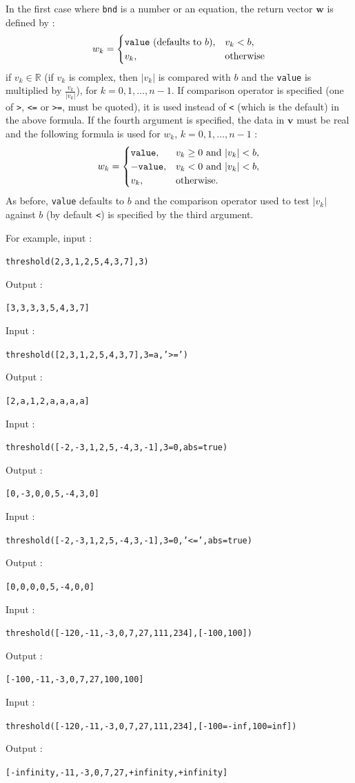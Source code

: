\documentclass[a4paper,11pt]{book}
\begin{document}
In the first case where {\tt bnd} is a number or an equation, the return vector $ \mathbf{w} $ is defined by :
\[ w_k=\begin{cases}
\text{{\tt value} (defaults to $ b $)},&v_k<b,\\
v_k,&\text{otherwise}
\end{cases} \]
if $ v_k\in\mathbb{R} $ (if $ v_k $ is complex, then $ |v_k| $ is compared with $ b $ and the {\tt value} is multiplied by $ \frac{v_k}{|v_k|} $), for $ k=0,1,\dots,n-1 $. If comparison operator is specified (one of {\tt >}, {\tt <=} or {\tt >=}, must be quoted), it is used instead of {\tt <} (which is the default) in the above formula. If the fourth argument is specified, the data in $ \mathbf{v} $ must be real and the following formula is used for $ w_k $, $ k=0,1,\dots,n-1 $ :
\[ w_k=\begin{cases}
\text{{\tt value}},& \text{$ v_k\geq 0 $ and $ |v_k|<b $},\\
-\text{{\tt value}},& \text{$ v_k<0 $ and $ |v_k|<b $},\\
v_k,&\text{otherwise}.
\end{cases} \]
As before, {\tt value} defaults to $ b $ and the comparison operator used to test $ |v_k| $ against $ b $ (by default {\tt <}) is specified by the third argument.

For example, input :
\begin{center}
	{\tt threshold(2,3,1,2,5,4,3,7],3)}
\end{center}
Output :
\begin{center}
	{\tt [3,3,3,3,5,4,3,7]}
\end{center}
Input :
\begin{center}
	{\tt threshold([2,3,1,2,5,4,3,7],3=a,'>=')}
\end{center}
Output :
\begin{center}
	{\tt [2,a,1,2,a,a,a,a]}
\end{center}
Input :
\begin{center}
	{\tt threshold([-2,-3,1,2,5,-4,3,-1],3=0,abs=true)}
\end{center}
Output :
\begin{center}
	{\tt [0,-3,0,0,5,-4,3,0]}
\end{center}
Input :
\begin{center}
	{\tt threshold([-2,-3,1,2,5,-4,3,-1],3=0,'<=',abs=true)}
\end{center}
Output :
\begin{center}
	{\tt [0,0,0,0,5,-4,0,0]}
\end{center}
Input :
\begin{center}
	{\tt threshold([-120,-11,-3,0,7,27,111,234],[-100,100])}
\end{center}
Output :
\begin{center}
	{\tt [-100,-11,-3,0,7,27,100,100]}
\end{center}
Input :
\begin{center}
	{\tt threshold([-120,-11,-3,0,7,27,111,234],[-100=-inf,100=inf])}
\end{center}
Output :
\begin{center}
	{\tt [-infinity,-11,-3,0,7,27,+infinity,+infinity]}
\end{center}
\end{document}

